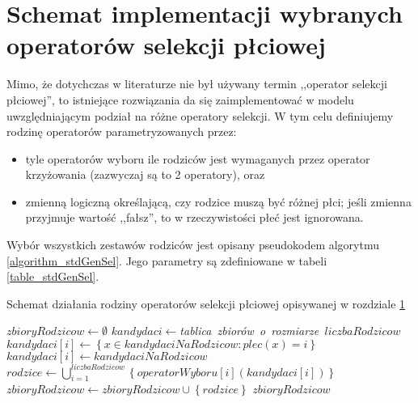 \documentclass[twoside]{iisthesis}
\begin{document}
\section{Schemat implementacji wybranych operatorów selekcji płciowej} \label{section_literatureSel}

Mimo, że dotychczas w literaturze nie był używany termin ,,operator selekcji płciowej'', to istniejące rozwiązania da się zaimplementować w modelu uwzględniającym podział na różne operatory selekcji. W tym celu definiujemy rodzinę operatorów parametryzowanych przez:
\begin{itemize}
	\item tyle operatorów wyboru ile rodziców jest wymaganych przez operator krzyżowania (zazwyczaj są to 2 operatory), oraz
	\item zmienną logiczną określającą, czy rodzice muszą być różnej płci; jeśli zmienna przyjmuje wartość ,,fałsz'', to w rzeczywistości płeć jest ignorowana.
\end{itemize}

Wybór wszystkich zestawów rodziców jest opisany pseudokodem algorytmu \ref{algorithm_stdGenSel}. Jego parametry są zdefiniowane w tabeli \ref{table_stdGenSel}.

\begin{algorithm}
	\caption{Schemat działania rodziny operatorów selekcji płciowej opisywanej w rozdziale \ref{section_literatureSel}}
	\label{algorithm_stdGenSel}
	\begin{algorithmic}[1]
		\Var $zbioryRodzicow \gets \emptyset$
		\Var $kandydaci \gets $\textit{tablica\ zbiorów\ o\ rozmiarze\ }$liczbaRodzicow$
		\State $kandydaci[i] \gets \left\{  x \in kandydaciNaRodzicow : plec(x) = i \right\}$
		\Else
		\State $kandydaci[i] \gets kandydaciNaRodzicow$
		\EndIf
		\EndFor
		\Var $rodzice \gets \bigcup_{i=1}^{liczbaRodzicow} \left\{ operatorWyboru[i](kandydaci[i]) \right\} $
		\State $zbioryRodzicow \gets zbioryRodzicow\cup \left\{ rodzice \right\}$
		\EndWhile
		\State \Return $zbioryRodzicow$
		\EndFunction
	\end{algorithmic}
\end{algorithm}
\end{document}
